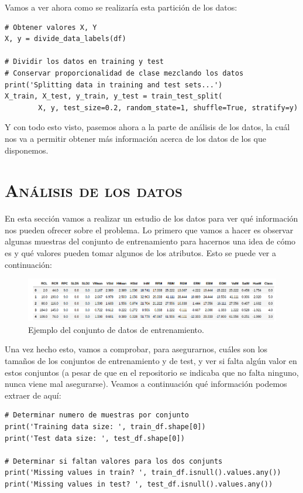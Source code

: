 \documentclass[11pt,a4paper]{article}
\begin{document}
Vamos a ver ahora como se realizaría esta partición de los datos:

\begin{lstlisting}
# Obtener valores X, Y
X, y = divide_data_labels(df)

# Dividir los datos en training y test
# Conservar proporcionalidad de clase mezclando los datos
print('Splitting data in training and test sets...')
X_train, X_test, y_train, y_test = train_test_split(
        X, y, test_size=0.2, random_state=1, shuffle=True, stratify=y)
\end{lstlisting}

Y con todo esto visto, pasemos ahora a la parte de análisis de los datos, la cuál nos va a permitir obtener más información acerca de
los datos de los que disponemos.

\newpage

\section{\textsc{Análisis de los datos}}

En esta sección vamos a realizar un estudio de los datos para ver qué información nos pueden ofrecer sobre el problema. Lo primero que
vamos a hacer es observar algunas muestras del conjunto de entrenamiento para hacernos una idea de cómo es y qué valores pueden tomar
algunos de los atributos. Esto se puede ver a continuación:

\begin{figure}[H]
    \centering
    \includegraphics[scale=0.4]{img/train_df_head.png}
    \caption{Ejemplo del conjunto de datos de entrenamiento.}
    \label{fig:train-df}
\end{figure}

Una vez hecho esto, vamos a comprobar, para asegurarnos, cuáles son los tamaños de los conjuntos de entrenamiento y de test, y ver
si falta algún valor en estos conjuntos (a pesar de que en el repositorio se indicaba que no falta ninguno, nunca viene mal asegurarse).
Veamos a continuación qué información podemos extraer de aquí:

\begin{lstlisting}
# Determinar numero de muestras por conjunto
print('Training data size: ', train_df.shape[0])
print('Test data size: ', test_df.shape[0])

# Determinar si faltan valores para los dos conjunts
print('Missing values in train? ', train_df.isnull().values.any())
print('Missing values in test? ', test_df.isnull().values.any())
\end{lstlisting}
\end{document}
